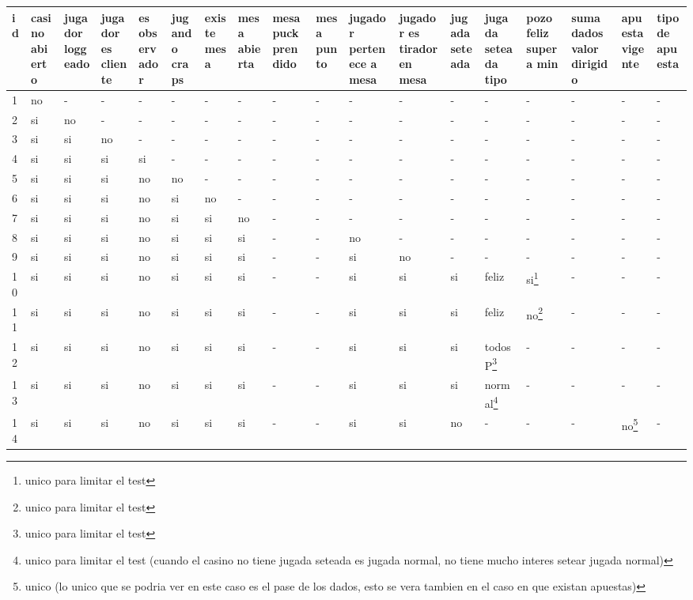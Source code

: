 \documentclass[a4paper, 10pt, notitlepage]{article}
\begin{document}
			\newpage
\begin{landscape}

\begin{tabularx}{1.6\textheight}{|X|X|X|X|X|X|X|X|X|X|X|X|X|X|X|X|X|X|}
\hline
id	&	casino abierto	&	jugador loggeado	& jugador es cliente &	es observador & jugando craps &	existe mesa	&	mesa abierta	&	mesa puck prendido	&	mesa punto	&	jugador pertenece a mesa	&	jugador es tirador en mesa	&	jugada seteada	&	jugada seteada tipo	&	pozo feliz supera min	&	suma dados valor dirigido	&	apuesta vigente	&	tipo de apuesta\\
\hline
1	&	no	&	-	  &	-   &-	  &	-	  &	-	  &	-	  &	-	&	-	&	-	  &	-	  &	-	&	-	&	-	&	-	&	- & -\\
2	&	si	&	no	&	-   & -	  &	-	  &	-	  &	-	  &	-	&	-	&	-	  &	-	  &	-	&	-	&	-	&	-	&	-	&	-\\
3	&	si	&	si	& no  & -  	&	-	  &	-	  &	-	  &	-	&	-	&	-	  &	-	  &	-	&	-	&	-	&	-	&	-	&	-\\
4 &	si	&	si	&	si	&	si	&	-	  &	-	  &	-	  &	-	&	-	&	-	  &	-	  &	-	&	-	&	-	&	-	&	-	&	-\\
5	&	si	&	si	&	si	&	no	&	no	&	-	  &	-	  &	-	&	-	&	-	  &	-	  &	-	&	-	&	-	&	-	&	-	&	-\\
6	&	si	&	si	&	si	&	no	&	si  &	no	&	-	  &	-	&	-	&	-	  &	-	  &	-	&	-	&	-	&	-	&	- & -\\
7	&	si	&	si	&	si	&	no	&	si	&	si  &	no	&	-	&	-	&	-	  &	-	  &	-	&	-	&	-	&	-	&	-	&	-\\
8	&	si	&	si	&	si	&	no	&	si	&	si	&	si	&	-	&	-	&	no	&	-	  &	-	&	-	&	-	&	-	&	-	&	-\\
9	&	si	&	si	&	si	&	no	&	si	&	si	&	si	&	-	&	-	&	si	&	no	&	-	&	-	&	-	&	-	&	-	&	-\\
10&	si	&	si	&	si	&	no	&	si	&	si	&	si	&	-	&	-	&	si	&	si	&	si	&	feliz	&	si\footnote{unico para limitar el test}	&	-	&	-	&	-\\
11	&	si	&	si	&	si	&	no	&	si	&	si	&	si	&	-	&	-	&	si	&	si	&	si	&	feliz	&	no\footnote{unico para limitar el test}	&	-	&	-	&	-\\
12	&	si	&	si	&	si	&	no	&	si	&	si	&	si	&	-	&	-	&	si	&	si	&	si	&	todosP\footnote{unico para limitar el test}	&	-	&	-	&	-	&	-\\
13	&	si	&	si	&	si	&	no	&	si	&	si	&	si	&	-	&	-	&	si	&	si	&	si	&	normal\footnote{unico para limitar el test (cuando el casino no tiene jugada seteada es jugada normal, no tiene mucho interes setear jugada normal)}	&	-	&	-	&	-	&	-\\
14	&	si	&	si	&	si	&	no	&	si	&	si	&	si	&	-	&	-	&	si	&	si	&	no	&	-	&	-	&	-	&	no\footnote{unico (lo unico que se podria ver en este caso es el pase de los dados, esto se vera tambien en el caso en que existan apuestas)}	&	-\\

\end{tabularx}
\end{landscape}
\end{document}
